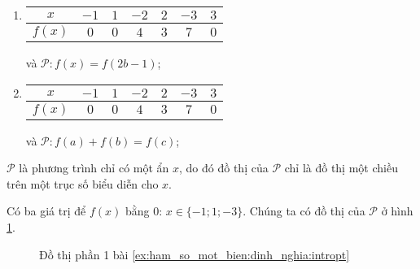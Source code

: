 \begin{enumerate}
   \item
   \begin{tabular}{|c|c|c|c|c|c|c|}
      \hline
      $x$ & $-1$ & $1$ & $-2$ & $2$ & $-3$ & $3$\\
      \hline
      $f(x)$ & $0$ & $0$ & $4$ & $3$ & $7$ & $0$\\
      \hline
   \end{tabular} và $\mathcal{P}: f(x) = f(2b - 1)$;

   \item 
   \begin{tabular}{|c|c|c|c|c|c|c|}
      \hline
      $x$ & $-1$ & $1$ & $-2$ & $2$ & $-3$ & $3$\\
      \hline
      $f(x)$ & $0$ & $0$ & $4$ & $3$ & $7$ & $0$\\
      \hline
   \end{tabular} và $\mathcal{P}: f(a) + f(b) = f(c)$;
\end{enumerate}


{
   \begin{minipageindent}{0.48\textwidth}
      \indent  $\mathcal{P}$ là phương trình chỉ có một ẩn $x$, do đó đồ thị của $\mathcal{P}$ chỉ là đồ thị một chiều trên một trục số biểu diễn cho $x$.

      Có ba giá trị để $f(x)$ bằng $0$: $x\in \{-1; 1; -3\}$. Chúng ta có đồ thị của $\mathcal{P}$ ở hình \ref{fig:ham_so_mot_bien:dinh_nghia:dtp1}.
   \end{minipageindent}
   \hfill
   \begin{minipageindent}{0.48\textwidth}
      \begin{figure}[H]
         \centering
         \caption{Đồ thị phần 1 bài \ref{ex:ham_so_mot_bien:dinh_nghia:intropt}}
         \label{fig:ham_so_mot_bien:dinh_nghia:dtp1}
      \end{figure}
   \end{minipageindent}
}


